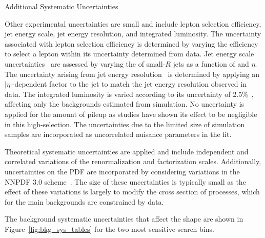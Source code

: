 \begin{section}{Additional Systematic Uncertainties}

Other experimental uncertainties are small and include lepton selection efficiency, jet energy scale, jet energy resolution, and integrated luminosity.
The uncertainty associated with lepton selection efficiency is determined by varying the efficiency to select a lepton within its uncertainty determined from data.
Jet energy scale uncertainties~\cite{Chatrchyan:2011ds,1748-0221-12-02-P02014} are assessed by varying the \pT of small-$R$ jets as a function of \pT and $\eta$.
The uncertainty arising from jet energy resolution~\cite{Chatrchyan:2011ds,1748-0221-12-02-P02014} is determined by applying an $|\eta|$-dependent factor to the jet \pT to match the jet energy resolution observed in data.
The integrated luminosity is varied according to its uncertainty of 2.5\%~\cite{CMS-PAS-LUM-17-001}, affecting only the backgrounds estimated from simulation.
No uncertainty is applied for the amount of pileup as studies have shown its effect to be negligible in this high-\HT selection.
The uncertainties due to the limited size of simulation samples are incorporated as uncorrelated nuisance parameters in the fit.

Theoretical systematic uncertainties are applied and include independent and correlated variations of the renormalization  and factorization scales.
Additionally, uncertainties on the PDF are incorporated by considering variations in the NNPDF 3.0 scheme~\cite{Ball:2014uwa}.
The size of these uncertainties is typically small as the effect of these variations is largely to modify the cross section of processes, which for the main backgrounds are constrained by data.

The background systematic uncertainties that affect the \Nb shape are shown in Figure~\ref{fig:bkg_sys_tables} for the two most sensitive search bins.


\end{section}

